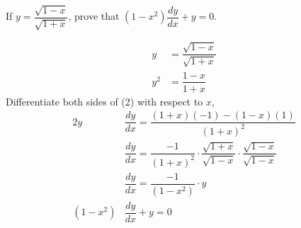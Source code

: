 

\question If $y=\dfrac{\sqrt{1-x}}{\sqrt{1+x}}$, prove that
$(1-x^2)\dfrac{dy}{dx}+y=0$.

\insertQR{}

\begin{solution}
  \begin{align}
    y  &=\dfrac{\sqrt{1-x}}{\sqrt{1+x}} \\
    y^2&=\dfrac{1-x}{1+x}
  \end{align}
  Differentiate both sides of (2) with respect to $x$,
  \begin{align}
         2y &\dfrac{dy}{dx}=\dfrac{(1+x)(-1)-(1-x)(1)}{(1+x)^2} \\
            &\dfrac{dy}{dx}=\dfrac{-1}{(1+x)^2}
                            \cdot\dfrac{\sqrt{1+x}}{\sqrt{1-x}}
                            \cdot\dfrac{\sqrt{1-x}}{\sqrt{1-x}} \\
            &\dfrac{dy}{dx}=\dfrac{-1}{(1-x^2)}\cdot y \\
    (1-x^2) &\dfrac{dy}{dx}+y=0
  \end{align}
\end{solution}

